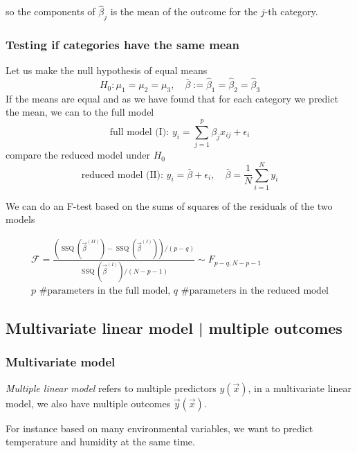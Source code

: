 so the components of $\hat{\beta}_j$ is the mean of the outcome for the $j$-th category.

\subsubsection{Testing if categories have the same mean}
Let us make the null hypothesis of equal means
\begin{equation}
    H_0: \mu_1 = \mu_2 = \mu_3, \quad \bar{\beta} := \hat{\beta}_1 = \hat{\beta}_2 = \hat{\beta}_3
\end{equation}
If the means are equal and as we have found that for each category we predict the mean,
we can to the full model
\begin{equation}
    \text{full model (I): } y_i = \sum_{j=1}^p \beta_j x_{ij} + \epsilon_i
\end{equation}
compare the reduced model under $H_0$
\begin{equation}
    \text{reduced model (II): } y_i = \bar{\beta} + \epsilon_i, \quad \bar{\beta} = \frac{1}{N} \sum_{i=1}^N y_i
\end{equation}

We can do an F-test based on the sums of squares of the residuals of the two models

\begin{equation}
    \begin{gathered}
        \mathcal{F} = \frac{\left(\operatorname{SSQ}(\vec{\beta}^{(I I)}) - \operatorname{SSQ}(\vec{\beta}^{(I)}) \right) \slash (p-q)}{\operatorname{SSQ}(\vec{\beta}^{(I)}) \slash (N-p-1)} \sim F_{p-q,N-p-1} \\
        p \text{ \# parameters in the full model, } q \text{ \# parameters in the reduced model}
    \end{gathered}
\end{equation}

\subsection{Multivariate linear model | multiple outcomes}
\subsubsection{Multivariate model}
\textit{Multiple linear model} refers to multiple predictors $y(\vec{x})$,
in a multivariate linear model, we also have multiple outcomes $\vec{y}(\vec{x})$.

For instance based on many environmental variables, we want to predict temperature
and humidity at the same time.

